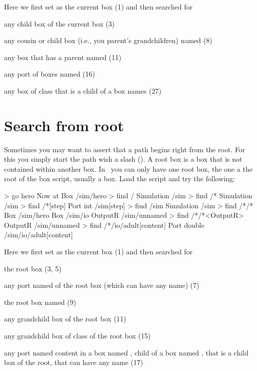 \noindent
Here we first set  as the current box (1) and then searched for 
\begin{compactitem}
\item any child box of the current box (3)
\item any cousin or child box (i.e., you parent's grandchildren) named  (8)
\item any box that has a parent named  (11)
\item any port of boxes named  (16)
\item any box of class  that is a child of a box names  (27)
\end{compactitem}

\section{Search from root}
Sometimes you may want to assert that a path begins right from the root. For this you simply start the path wish a slash (\code{/}). A root box is a box that is not contained within another box. In \US\ you can only have one root box, the one a the root of the box script, usually a  box. Load the  script and try the following:

\lstset{numbers=left}
\begin{usdialog}
> go hero
Now at Box /sim/hero
> find /
Simulation /sim
> find /*
Simulation /sim
> find /*[step]
Port int /sim[step]
> find /sim
Simulation /sim
> find /*/*
Box     /sim/hero
Box     /sim/io
OutputR /sim/unnamed
> find /*/*<OutputR>
OutputR /sim/unnamed
> find /*/io/adult[content]
Port double /sim/io/adult[content]
\end{usdialog}
\lstset{numbers=none}

\noindent
Here we first set  as the current box (1) and then searched for 
\begin{compactitem}
\item the root box (3, 5)
\item any port named  of the root box (which can have any name) (7)
\item the root box named  (9)
\item any grandchild box of the root box (11)
\item any grandchild box of class  of the root box (15)
\item any port named content in a box named , child of a box named , that is a child box of the root, that can have any name (17)
\end{compactitem}

